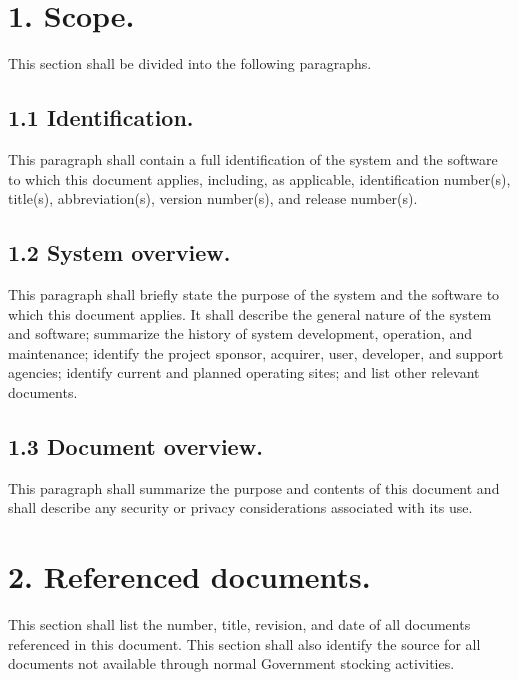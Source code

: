 \section{1. Scope.}

This section shall be divided into the following paragraphs.

\subsection{1.1 Identification.}

This paragraph shall contain a full identification of the system and the
software to which this document applies, including, as applicable,
identification number(s), title(s), abbreviation(s), version number(s),
and release number(s).

\subsection{1.2 System overview.}

This paragraph shall briefly state the purpose of the system and the
software to which this document applies. It shall describe the general
nature of the system and software; summarize the history of system
development, operation, and maintenance; identify the project sponsor,
acquirer, user, developer, and support agencies; identify current and
planned operating sites; and list other relevant documents.

\subsection{1.3 Document overview.}

This paragraph shall summarize the purpose and contents of this document
and shall describe any security or privacy considerations associated
with its use.

\section{}

\section{2. Referenced documents.}

This section shall list the number, title, revision, and date of all
documents referenced in this document. This section shall also identify
the source for all documents not available through normal Government
stocking activities.

